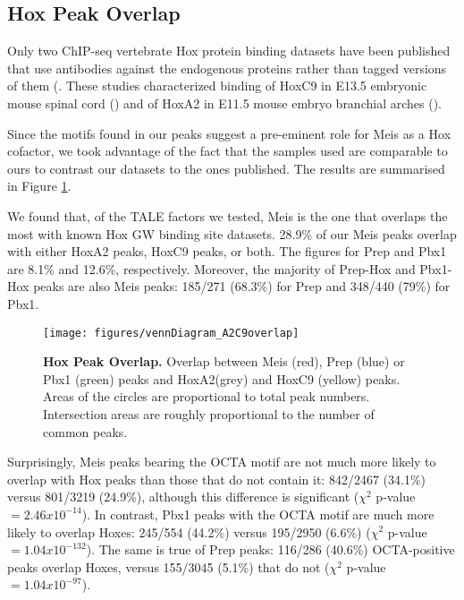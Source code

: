 \subsection{Hox Peak Overlap}

Only two ChIP-seq vertebrate Hox protein binding datasets have been published that use antibodies against the endogenous proteins rather than tagged versions of them (\cite{Jung2010,Donaldson2012}. These studies characterized binding of HoxC9 in E13.5 embryonic mouse spinal cord (\cite{Jung2010}) and of HoxA2 in E11.5 mouse embryo branchial arches (\cite{Donaldson2012}).

Since the motifs found in our peaks suggest a pre-eminent role for Meis as a Hox cofactor, we took advantage of the fact that the samples used are comparable to ours to contrast our datasets to the ones published. The results are summarised in Figure \ref{fig:HoxOverlap}.

We found that, of the \ac{TALE} factors we tested, Meis is the one that overlaps the most with known Hox \ac{GW} binding site datasets. 28.9\% of our Meis peaks overlap with either HoxA2 peaks, HoxC9 peaks, or both. The figures for Prep and Pbx1 are 8.1\% and 12.6\%, respectively. Moreover, the majority of Prep-Hox and Pbx1-Hox peaks are also Meis peaks: 185/271 (68.3\%) for Prep and 348/440 (79\%) for Pbx1. 

\begin{figure}[]
  \centering
  \texttt{[image: figures/vennDiagram\_A2C9overlap]}
  \caption[Hox Peak Overlap]{\textbf{Hox Peak Overlap.} Overlap between Meis (red), Prep (blue) or Pbx1 (green) peaks and HoxA2(grey) and HoxC9 (yellow) peaks. Areas of the circles are proportional to total peak numbers. Intersection areas are roughly proportional to the number of common peaks.}
  \label{fig:HoxOverlap}
\end{figure}

Surprisingly, Meis peaks bearing the \ac{OCTA} motif are not much more likely to overlap with Hox peaks than those that do not contain it: 842/2467 (34.1\%) versus 801/3219 (24.9\%), although this difference is significant ($\chi^2$ p-value $= 2.46 x 10^{-14}$). In contrast, Pbx1 peaks with the \ac{OCTA} motif are much more likely to overlap Hoxes: 245/554 (44.2\%) versus 195/2950 (6.6\%) ($\chi^2$ p-value $= 1.04 x 10^{-132}$). The same is true of Prep peaks: 116/286 (40.6\%) \ac{OCTA}-positive peaks overlap Hoxes, versus 155/3045 (5.1\%) that do not ($\chi^2$ p-value $= 1.04 x 10^{-97}$).%

